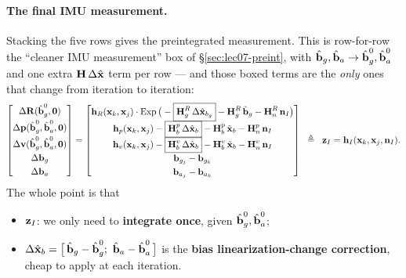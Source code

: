 \paragraph{The final IMU measurement.} Stacking the five rows gives the preintegrated measurement. This is row-for-row the ``cleaner IMU measurement'' box of \S\ref{sec:lec07-preint}, with $\hat{\vect{b}}_g, \hat{\vect{b}}_a \to \hat{\vect{b}}_g^0, \hat{\vect{b}}_a^0$ and one extra $\vect{H}\,\Delta\hat{\vect{x}}$ term per row --- and those boxed terms are the \emph{only} ones that change from iteration to iteration:
\begin{align}
\begin{bmatrix}
\Delta\vect{R}(\hat{\vect{b}}_g^0, \vect{0}) \\[3pt]
\Delta\vect{p}(\hat{\vect{b}}_g^0, \hat{\vect{b}}_a^0, \vect{0}) \\[3pt]
\Delta\vect{v}(\hat{\vect{b}}_g^0, \hat{\vect{b}}_a^0, \vect{0}) \\[3pt]
\Delta\vect{b}_g \\[3pt]
\Delta\vect{b}_a
\end{bmatrix}
=
\begin{bmatrix}
\vect{h}_R(\vect{x}_k, \vect{x}_j)\cdot\Exp\big(-\boxed{\vect{H}_g^R\,\Delta\hat{\vect{x}}_{b_g}} - \vect{H}_g^R\,\tilde{\vect{b}}_g - \vect{H}_n^R\,\vect{n}_I\big) \\[3pt]
\vect{h}_p(\vect{x}_k, \vect{x}_j) - \boxed{\vect{H}_b^p\,\Delta\hat{\vect{x}}_b} - \vect{H}_b^p\,\tilde{\vect{x}}_b - \vect{H}_n^p\,\vect{n}_I \\[3pt]
\vect{h}_v(\vect{x}_k, \vect{x}_j) - \boxed{\vect{H}_b^v\,\Delta\hat{\vect{x}}_b} - \vect{H}_b^v\,\tilde{\vect{x}}_b - \vect{H}_n^v\,\vect{n}_I \\[3pt]
\vect{b}_{g_j} - \vect{b}_{g_k} \\[3pt]
\vect{b}_{a_j} - \vect{b}_{a_k}
\end{bmatrix}
\;\;\triangleq\;\;
\vect{z}_I = \vect{h}_I(\vect{x}_k, \vect{x}_j, \vect{n}_I).
\label{eq:lec07-zI}
\end{align}
The whole point is that
\begin{itemize}[noitemsep,topsep=2pt]
\item $\vect{z}_I$: we only need to \textbf{integrate once}, given $\hat{\vect{b}}_g^0, \hat{\vect{b}}_a^0$;
\item $\Delta\hat{\vect{x}}_b = \big[\,\hat{\vect{b}}_g - \hat{\vect{b}}_g^0;\ \hat{\vect{b}}_a - \hat{\vect{b}}_a^0\,\big]$ is the \textbf{bias linearization-change correction}, cheap to apply at each iteration.
\end{itemize}


